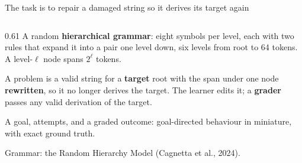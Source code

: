 \documentclass[aspectratio=169,11pt]{beamer}
\newcommand{\hltext}[1]{\textcolor{mainblue}{\textbf{#1}}}
\newcommand{\dimtext}[1]{\textcolor{grayout}{#1}}
\newcommand{\redtext}[1]{\textcolor{warmred}{\textbf{#1}}}
\begin{document}
\begin{frame}{The task is to repair a damaged string so it derives its target again}
\begin{columns}[T]
\begin{column}{0.61\textwidth}
{\small A random \hltext{hierarchical grammar}: eight symbols per level, each with two rules that expand it into a pair one level down, six levels from root to 64 tokens. A level-$\ell$ node spans $2^\ell$ tokens.}

\smallskip
{\small A problem is a valid string for a \hltext{target} root with the span under one node \redtext{rewritten}, so it no longer derives the target. The learner edits it; a \hltext{grader} passes any valid derivation of the target.}

\smallskip
{\small A goal, attempts, and a graded outcome: goal-directed behaviour in miniature, with exact ground truth.}

\smallskip
\dimtext{\scriptsize Grammar: the Random Hierarchy Model (Cagnetta et al., 2024).}
\end{column}


\end{columns}
\end{frame}
\end{document}
